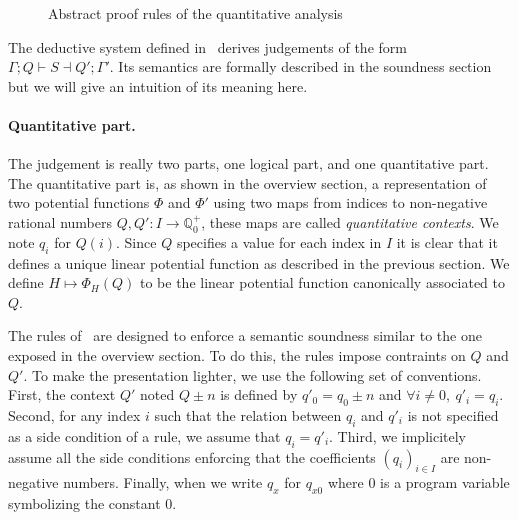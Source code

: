 \documentclass[nocopyrightspace,preprint]{sigplanconf}
\newcommand{\pref}[1]{\prettyref{#1}}
\begin{document}
\begin{figure}[ht!]
\caption{Abstract proof rules of the quantitative analysis}
\label{fig:proof}
\end{figure}

The deductive system defined in~\pref{fig:proof} derives
judgements of the form $\Gamma; Q \vdash S \dashv Q'; \Gamma'$.
Its semantics are formally described in the soundness section but we
will give an intuition of its meaning here.

\paragraph{Quantitative part.}
The judgement is really two parts, one logical part, and one quantitative
part.  The quantitative part is, as shown in the overview section, a
representation of two potential functions $\Phi$ and $\Phi'$ using
two maps from indices to non-negative rational numbers
$Q, Q' : I \rightarrow \mathbb Q_0^+$, these maps are called
\emph{quantitative contexts}.
We note $q_i$ for $Q(i)$.  Since $Q$ specifies a value for each
index in $I$ it is clear that it defines a unique linear potential function
as described in the previous section. We define $H \mapsto \Phi_H(Q)$
to be the linear potential function canonically associated to $Q$.

The rules of~\pref{fig:proof} are designed to enforce a semantic
soundness similar to the one exposed in the overview section.  To
do this, the rules impose contraints on $Q$ and $Q'$.  To make the
presentation lighter, we use the following  set of conventions.
First, the context $Q'$ noted $Q \pm n$ is defined by $q'_0 = q_0 \pm n$
and $\forall i \neq 0,~q'_i = q_i$.  Second, for any index $i$ such that
the relation between $q_i$ and $q'_i$ is not specified as a side condition
of a rule, we assume that $q_i = q'_i$.  Third, we implicitely assume
all the side conditions enforcing that the coefficients $(q_i)_{i \in I}$ are
non-negative numbers. Finally, when we write $q_x$ for $q_{x0}$ where
0 is a program variable symbolizing the constant 0.
\end{document}

